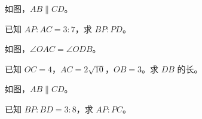 \documentclass{exam-zh}
\begin{document}

\begin{problem}[points=10]
  \noindent
  \begin{minipage}[t]{\dimexpr\linewidth-60mm-6mm\relax}
    \vspace{0pt}
    如图，$AB\parallel CD$。

已知 $AP:AC=3:7$，求 $BP:PD$。
    
  \end{minipage}\hfill
  \begin{diagramcoltikz}{60mm}{}
  }
  \end{diagramcoltikz}
  \par\medskip
  \answerarea[48mm]
\end{problem}



\begin{problem}[points=10]
  \noindent
  \begin{minipage}[t]{\dimexpr\linewidth-60mm-6mm\relax}
    \vspace{0pt}
    如图，$\angle OAC=\angle ODB$。

已知 $OC=4$，$AC=2\sqrt{10}$，$OB=3$。求 $DB$ 的长。
    
  \end{minipage}\hfill
  \begin{diagramcoltikz}{60mm}{}
  }
  \end{diagramcoltikz}
  \par\medskip
  \answerarea[54mm]
\end{problem}



\begin{problem}[points=10]
  \noindent
  \begin{minipage}[t]{\dimexpr\linewidth-60mm-6mm\relax}
    \vspace{0pt}
    如图，$AB\parallel CD$。

已知 $BP:BD=3:8$，求 $AP:PC$。
    
  \end{minipage}\hfill
  \begin{diagramcoltikz}{60mm}{}
  }
  \end{diagramcoltikz}
  \par\medskip
  \answerarea[48mm]
\end{problem}
\end{document}
